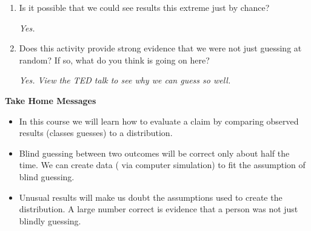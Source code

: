 \begin{enumerate}
\begin{enumerate}
\item  How unusual are the classes   answers relative to the ``just guessing'' spinner results?
\begin{students}
  \vspace{2cm}
\end{students}    
\begin{key}
   {\it Way out in the tail, I hope.}
\end{key}
\end{enumerate}
\item  Is it possible that we could see results this extreme just by
  chance?
\begin{students}
  \vspace{2cm}
\end{students}    
\begin{key}
   {\it Yes.}
\end{key}

\item Does this activity provide strong evidence that we were not just
  guessing at random?  If so, what do you think is going on here?
\begin{students}
  \vspace{2cm}
\end{students}    
\begin{key}
   {\it  Yes. View the TED talk to see why we can guess so well.}
\end{key}
  
\end{enumerate}


\begin{center}
  {\bf Take Home Messages}
\end{center}
  \begin{itemize}
  \item In this course we will learn how to evaluate a claim by
    comparing observed results (classes guesses) to a distribution.

  \item Blind guessing between two outcomes will be correct only
    about half the time. We can create data ( via computer simulation)
    to fit the assumption of blind guessing.

  \item Unusual results will make us doubt the assumptions used to
    create the distribution.  A large number correct is evidence that
    a person was not just blindly guessing.
  \end{itemize} \vspace{.4in}

